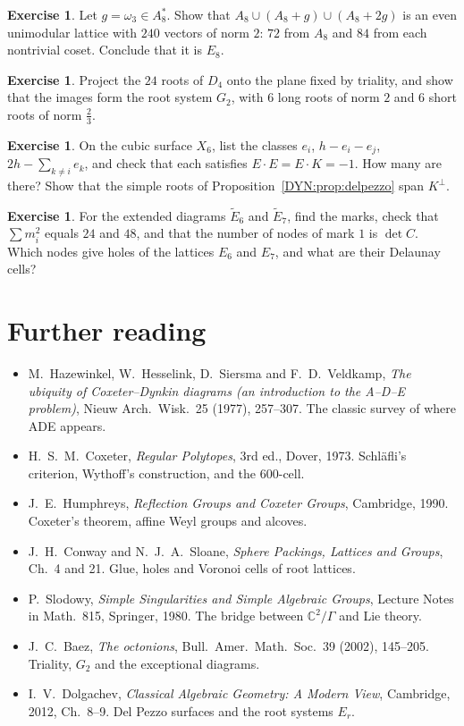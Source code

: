 \documentclass[11pt,openany]{book}
\theoremstyle{plain}
\theoremstyle{definition}
\newtheorem{exercise}[theorem]{Exercise}
\theoremstyle{remark}
\newcommand{\C}{\mathbb{C}}
\begin{document}
\begin{exercise}
Let $g=\omega_3\in A_8^*$. Show that $A_8\cup(A_8+g)\cup(A_8+2g)$ is an even unimodular lattice with $240$
vectors of norm $2$: $72$ from $A_8$ and $84$ from each nontrivial coset. Conclude that it is $E_8$.
\end{exercise}

\begin{exercise}
Project the $24$ roots of $D_4$ onto the plane fixed by triality, and show that the images form the root
system $G_2$, with $6$ long roots of norm $2$ and $6$ short roots of norm $\frac23$.
\end{exercise}

\begin{exercise}
On the cubic surface $X_6$, list the classes $e_i$, $h-e_i-e_j$, $2h-\sum_{k\ne i}e_k$, and check that each
satisfies $E\cdot E=E\cdot K=-1$. How many are there? Show that the simple roots of
Proposition~\ref{DYN:prop:delpezzo} span $K^\perp$.
\end{exercise}

\begin{exercise}
For the extended diagrams $\tilde E_6$ and $\tilde E_7$, find the marks, check that $\sum m_i^2$ equals
$24$ and $48$, and that the number of nodes of mark $1$ is $\det C$. Which nodes give holes of the
lattices $E_6$ and $E_7$, and what are their Delaunay cells?
\end{exercise}

\section*{Further reading}
\begin{itemize}[nosep]
\item M.~Hazewinkel, W.~Hesselink, D.~Siersma and F.~D.~Veldkamp, \emph{The ubiquity of Coxeter--Dynkin
  diagrams (an introduction to the A--D--E problem)}, Nieuw Arch.\ Wisk.~25 (1977), 257--307. The
  classic survey of where ADE appears.
\item H.~S.~M.~Coxeter, \emph{Regular Polytopes}, 3rd ed., Dover, 1973. Schl\"afli's criterion, Wythoff's
  construction, and the $600$-cell.
\item J.~E.~Humphreys, \emph{Reflection Groups and Coxeter Groups}, Cambridge, 1990. Coxeter's theorem,
  affine Weyl groups and alcoves.
\item J.~H.~Conway and N.~J.~A.~Sloane, \emph{Sphere Packings, Lattices and Groups}, Ch.~4 and 21. Glue,
  holes and Voronoi cells of root lattices.
\item P.~Slodowy, \emph{Simple Singularities and Simple Algebraic Groups}, Lecture Notes in Math.~815,
  Springer, 1980. The bridge between $\C^2/\Gamma$ and Lie theory.
\item J.~C.~Baez, \emph{The octonions}, Bull.\ Amer.\ Math.\ Soc.~39 (2002), 145--205. Triality, $G_2$ and
  the exceptional diagrams.
\item I.~V.~Dolgachev, \emph{Classical Algebraic Geometry: A Modern View}, Cambridge, 2012, Ch.~8--9.
  Del Pezzo surfaces and the root systems $E_r$.
\end{itemize}
\endgroup
\end{document}
